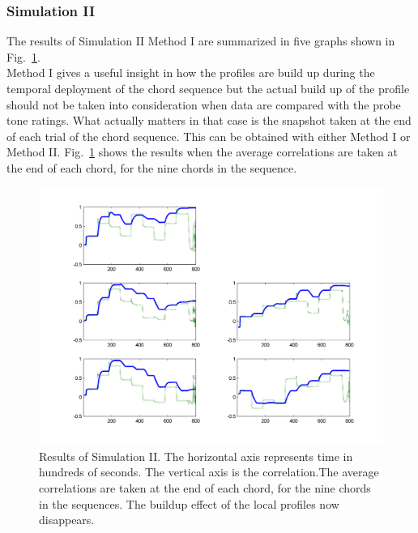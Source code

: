 \subsubsection*{Simulation II}
The results of Simulation II Method I are summarized in five
graphs shown in Fig.~\ref{Fig:TonalityDemoFig100}.\\

Method I gives a useful insight in how the profiles are build up
during the temporal deployment of the chord sequence but the
actual build up of the profile should not be taken into
consideration when data are compared with the probe tone ratings.
What actually matters in that case is the snapshot taken at the
end of each trial of the chord sequence. This can be obtained with
either Method I or Method II. Fig.~\ref{Fig:TonalityDemoFig100}
shows the results when the average correlations are taken at the
end of each chord, for the nine chords in the
sequence.\\

\begin{figure}[!h]
    \centering
    \includegraphics[width=\IPEMDefaultFigureWidth]{Graphics/TonalityDemoFig100}
    \caption{Results of Simulation II. The horizontal axis represents time in hundreds of seconds. The
    vertical axis is the correlation.The average correlations are
    taken at the end of each chord, for the nine chords in the
    sequences. The buildup effect of the local profiles now
    disappears.}
    \label{Fig:TonalityDemoFig100}
\end{figure}


